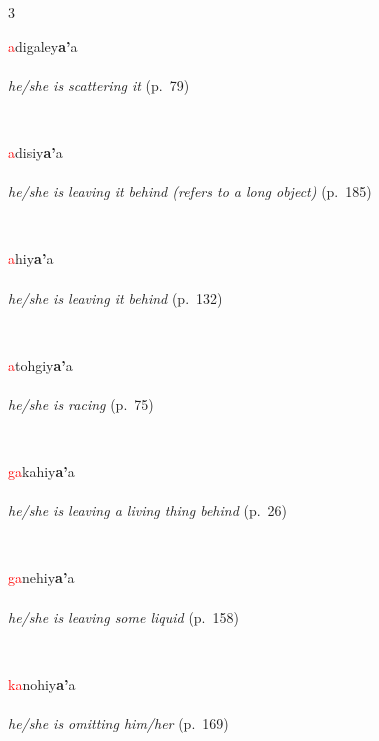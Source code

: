 \documentclass[oneside,openany]{book}%
\begin{document}
\noindent\begin{multicols}{3}%
\begin{minipage}[t]{\linewidth}
\raggedright\noindent \textcolor{Red}{a}digaley\textbf{a'}a\\
\\
\noindent \textit{he/she is scattering it} (p.~79)
\end{minipage}\\[1em]%
\begin{minipage}[t]{\linewidth}
\raggedright\noindent \textcolor{Red}{a}disiy\textbf{a'}a\\
\\
\noindent \textit{he/she is leaving it behind (refers to a long object)} (p.~185)
\end{minipage}\\[1em]%
\begin{minipage}[t]{\linewidth}
\raggedright\noindent \textcolor{Red}{a}hiy\textbf{a'}a\\
\\
\noindent \textit{he/she is leaving it behind} (p.~132)
\end{minipage}\\[1em]%
\begin{minipage}[t]{\linewidth}
\raggedright\noindent \textcolor{Red}{a}tohgiy\textbf{a'}a\\
\\
\noindent \textit{he/she is racing} (p.~75)
\end{minipage}\\[1em]%
\begin{minipage}[t]{\linewidth}
\raggedright\noindent \textcolor{Red}{ga}kahiy\textbf{a'}a\\
\\
\noindent \textit{he/she is leaving a living thing behind} (p.~26)
\end{minipage}\\[1em]%
\begin{minipage}[t]{\linewidth}
\raggedright\noindent \textcolor{Red}{ga}nehiy\textbf{a'}a\\
\\
\noindent \textit{he/she is leaving some liquid} (p.~158)
\end{minipage}\\[1em]%
\begin{minipage}[t]{\linewidth}
\raggedright\noindent \textcolor{Red}{ka}nohiy\textbf{a'}a\\
\\
\noindent \textit{he/she is omitting him/her} (p.~169)
\end{minipage}\\[1em]%
\end{multicols}%
\end{document}
